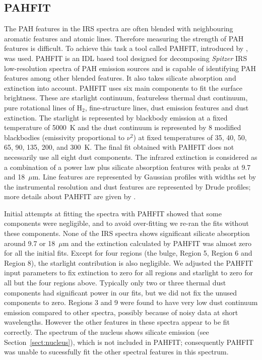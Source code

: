 \subsection{PAHFIT}
\label{sect:pahfit}
The PAH features in the IRS spectra are often blended with neighbouring aromatic features and atomic lines. 
Therefore measuring the strength of PAH features is difficult.  To achieve this task a tool called PAHFIT, introduced by \citet{Smith:2007lr}, was used. 
PAHFIT is an IDL  based tool designed for decomposing {\em Spitzer} IRS low-resolution spectra of PAH emission sources and is capable of identifying PAH features among other blended features. It also takes silicate absorption and extinction into account. 
PAHFIT uses six main components to fit the surface brightness. These are starlight continuum, featureless thermal dust continuum, 
pure rotational lines of H$_2$, fine-structure lines, dust emission features and dust extinction. The starlight is represented by  blackbody 
emission at a fixed temperature of 5000~K and the dust continuum is represented by 8 modified blackbodies (emissivity proportional to $\nu^2$)  
at fixed temperatures of 35, 40, 50, 65, 90, 135, 200, and 300~K. The final fit obtained with PAHFIT does not necessarily use
all eight dust components.
The infrared extinction is considered as a combination of a power law plus silicate absorption features with peaks at 9.7 and 18~$\mu$m. 
Line features are represented by Gaussian profiles with widths set by the instrumental resolution
and dust features are represented by Drude profiles; more details about PAHFIT are given by \citet{Smith:2007lr}.


Initial attempts at fitting the spectra with PAHFIT showed that some components were negligible, and
to avoid over-fitting we re-ran the fits without these components.
None of the IRS spectra shows significant silicate absorption around 9.7 or 18~$\mu$m and the extinction calculated by PAHFIT 
was almost zero for all the initial fits. Except for four regions (the bulge, Region 5, Region 6 and Region 8),
the starlight contribution is also negligible.
We adjusted the PAHFIT input parameters to fix extinction to zero for all regions and starlight to zero for all but the four regions above.
Typically only two or three thermal dust components had significant power in our fits, but we did not fix the unused components to zero.
Regions 3 and 9 were found to have very low dust continuum emission compared to other spectra,
possibly because of noisy data at short wavelengths. However the other features in these spectra appear to
be fit correctly.
The spectrum of the nucleus shows silicate emission (see Section~\ref{sect:nucleus}), which is not included in PAHFIT;  
consequently PAHFIT was unable to sucessfully fit the other spectral features in this spectrum.

